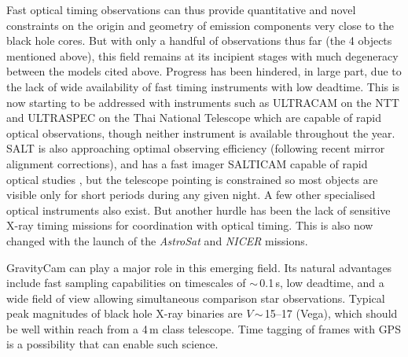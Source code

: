 \documentclass{pasa}%
\begin{document}
Fast optical timing observations can thus provide quantitative and novel constraints on the origin and geometry of emission components very close to the black hole cores. But with only a handful of observations thus far (the 4 objects mentioned above), this field remains at its incipient stages with much degeneracy between the models cited above. 
Progress has been hindered, in large part, due to the lack of wide availability of fast timing instruments with low deadtime. This is now starting to be addressed with instruments such as ULTRACAM \citep{ultracam} on the NTT and ULTRASPEC \citep{ultraspec} on the Thai National Telescope which are capable of rapid optical observations, though neither instrument is available throughout the year. SALT is also approaching optimal observing efficiency (following recent mirror alignment corrections), and has a fast imager SALTICAM capable of rapid optical studies \citep{salticam}, but the telescope pointing is constrained so most objects are visible only for short periods during any given night. A few other specialised optical instruments also exist. But another hurdle has been the lack of sensitive X-ray timing missions for coordination with optical timing. This is also now changed with the launch of the {\em AstroSat} and {\em NICER} missions. 

GravityCam can play a major role in this emerging field. Its natural advantages include fast sampling capabilities on timescales of $\sim$\,0.1\,s, low deadtime, and a wide field of view allowing simultaneous comparison star observations. Typical peak magnitudes of black hole X-ray binaries are $V$\,$\sim$\,15--17 (Vega), which should be well within reach from a 4\,m class telescope. Time tagging of frames with GPS is a possibility that can enable such science. 

\end{document}
